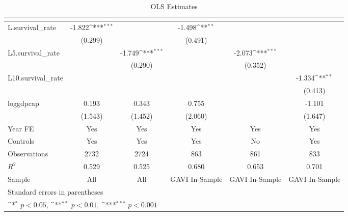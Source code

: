 \begin{table}[htbp]\centering
\def\sym#1{\ifmmode^{#1}\else\(^{#1}\)\fi}
\caption{OLS Estimates}
\begin{tabular}{l*{5}{c}}
\toprule
                &\multicolumn{1}{c}{}&\multicolumn{1}{c}{}&\multicolumn{1}{c}{}&\multicolumn{1}{c}{}&\multicolumn{1}{c}{}\\
\midrule
L.survival\_rate &   -1.822\sym{***}&                  &   -1.498\sym{**} &                  &                  \\
                &  (0.299)         &                  &  (0.491)         &                  &                  \\
\addlinespace
L5.survival\_rate&                  &   -1.749\sym{***}&                  &   -2.073\sym{***}&                  \\
                &                  &  (0.290)         &                  &  (0.352)         &                  \\
\addlinespace
L10.survival\_rate&                  &                  &                  &                  &   -1.334\sym{**} \\
                &                  &                  &                  &                  &  (0.413)         \\
\addlinespace
loggdpcap       &    0.193         &    0.343         &    0.755         &                  &   -1.101         \\
                &  (1.543)         &  (1.452)         &  (2.060)         &                  &  (1.647)         \\
\addlinespace
Year FE         &      Yes         &      Yes         &      Yes         &      Yes         &      Yes         \\
\addlinespace
Controls        &      Yes         &      Yes         &      Yes         &       No         &      Yes         \\
\midrule
Observations    &     2732         &     2724         &      863         &      861         &      833         \\
\(R^{2}\)       &    0.529         &    0.525         &    0.680         &    0.653         &    0.701         \\
Sample          &      All         &      All         &GAVI In-Sample         &GAVI In-Sample         &GAVI In-Sample         \\
\bottomrule
\multicolumn{6}{l}{\footnotesize Standard errors in parentheses}\\
\multicolumn{6}{l}{\footnotesize \sym{*} \(p<0.05\), \sym{**} \(p<0.01\), \sym{***} \(p<0.001\)}\\
\end{tabular}
\end{table}

